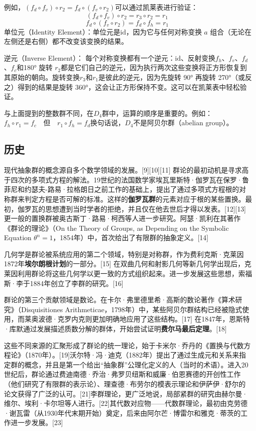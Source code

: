 例如，\((f_d \circ f_v) \circ r_2 = f_d \circ (f_v \circ r_2)\)可以通过凯莱表进行验证：  
\[
(f_d \circ f_v) \circ r_2 = r_3 \circ r_2 = r_1~
\]
\[
f_d \circ (f_v \circ r_2) = f_d \circ f_h = r_1~
\]  
单位元（Identity Element）：单位元是\( \text{id} \)，因为它与任何对称变换 \( a \) 组合（无论在左侧还是右侧）都不改变该变换的结果。

逆元（Inverse Element）： 每个对称变换都有一个逆元：\( \text{id} \)、反射变换\( f_h \)、\( f_v \)、\( f_d \)、\( f_c \)和180° 旋转 \( r_2 \)都是它们自己的逆元，因为执行两次这些变换将正方形恢复到其原始的朝向。旋转变换\( r_3 \)和\( r_1 \)是彼此的逆元，因为先旋转 90° 再旋转 270°（或反之）得到的结果是旋转 360°，这会让正方形保持不变。这可以在凯莱表中轻松验证。

与上面提到的整数群不同，在\( D_4 \)群中，运算的顺序是重要的。例如：\(
f_h \circ r_1 = f_c \quad \text{但} \quad r_1 \circ f_h = f_d\)换句话说，\( D_4 \)不是阿贝尔群（abelian group）。
\subsection{历史}  
现代抽象群的概念源自多个数学领域的发展。[9][10][11] 群论的最初动机是寻求高于四次的多项式方程的解法。19世纪的法国数学家埃瓦里斯特·伽罗瓦在保罗·鲁菲尼和约瑟夫-路易·拉格朗日之前工作的基础上，提出了通过多项式方程根的对称群来判定方程是否可解的标准。这样的\textbf{伽罗瓦群}的元素对应于根的某些置换。最初，伽罗瓦的思想遭到当时学者的拒绝，并且仅在他去世后才得以发表。[12][13] 更一般的置换群被奥古斯丁·路易·柯西等人进一步研究。阿瑟·凯利在其著作《群论的理论》（On the Theory of Groups, as Depending on the Symbolic Equation \( \theta^n = 1 \)，1854年）中，首次给出了有限群的抽象定义。[14]

几何学是群论被系统应用的第二个领域，特别是对称群，作为费利克斯·克莱因1872年\textbf{埃尔朗根计划}的一部分。[15] 在双曲几何和射影几何等新几何学出现后，克莱因利用群论将这些几何学以更一致的方式组织起来。进一步发展这些思想，索福斯·李于1884年创立了李群的研究。[16]

群论的第三个贡献领域是数论。在卡尔·弗里德里希·高斯的数论著作《算术研究》（Disquisitiones Arithmeticae，1798年）中，某些阿贝尔群结构已经被隐式使用，而莱奥波德·克罗内克则更加明确地应用了这些结构。[17] 在1847年，恩斯特·库默通过发展描述质数分解的群体，开始尝试证明\textbf{费尔马最后定理}。[18]

这些不同来源的汇聚形成了群论的统一理论，始于卡米尔·乔丹的《置换与代数方程论》（1870年）。[19]沃尔特·冯·迪克（1882年）提出了通过生成元和关系来指定群的概念，并且是第一个给出“抽象群”公理化定义的人（当时的术语）。进入20世纪后，群论通过费迪南德·乔治·弗罗贝纽斯和威廉·伯恩赛德的开创性工作（他们研究了有限群的表示论）、理查德·布劳尔的模表示理论和伊萨伊·舒尔的论文获得了广泛的认可。[21]李群理论，更广泛地说，局部紧群的研究由赫尔曼·维尔、埃利·卡尔坦等人进行。[22]其代数对应物——代数群理论，最初由克劳德·谢瓦雷（从1930年代末期开始）奠定，后来由阿尔芒·博雷尔和雅克·蒂茨的工作进一步发展。[23]

